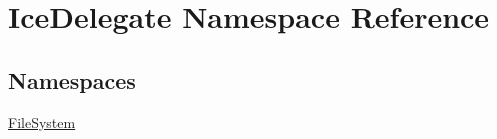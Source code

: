 \hypertarget{namespace_ice_delegate}{}\section{Ice\+Delegate Namespace Reference}
\label{namespace_ice_delegate}
\subsection*{Namespaces}
\begin{DoxyCompactItemize}
\item 
 \hyperlink{namespace_ice_delegate_1_1_file_system}{File\+System}
\end{DoxyCompactItemize}
